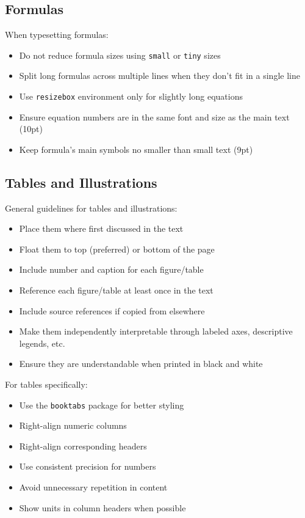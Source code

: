 \subsection{Formulas}
When typesetting formulas:
\begin{itemize}
\item Do not reduce formula sizes using {\tt small} or {\tt tiny} sizes
\item Split long formulas across multiple lines when they don't fit in a single line
\item Use {\tt resizebox} environment only for slightly long equations
\item Ensure equation numbers are in the same font and size as the main text (10pt)
\item Keep formula's main symbols no smaller than {\small small} text (9pt)
\end{itemize}

\subsection{Tables and Illustrations}
General guidelines for tables and illustrations:
\begin{itemize}
\item Place them where first discussed in the text
\item Float them to top (preferred) or bottom of the page
\item Include number and caption for each figure/table
\item Reference each figure/table at least once in the text
\item Include source references if copied from elsewhere
\item Make them independently interpretable through labeled axes, descriptive legends, etc.
\item Ensure they are understandable when printed in black and white
\end{itemize}

For tables specifically:
\begin{itemize}
\item Use the {\tt booktabs} package for better styling
\item Right-align numeric columns
\item Right-align corresponding headers
\item Use consistent precision for numbers
\item Avoid unnecessary repetition in content
\item Show units in column headers when possible
\end{itemize}

